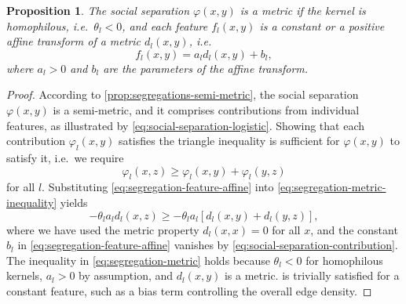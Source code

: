 \documentclass{scrartcl}
\newtheorem{prop}{Proposition}
\begin{document}
\begin{refsection}
\begin{prop}
    The social separation $\varphi(x,y)$ is a metric if the kernel is homophilous, i.e.\ $\theta_l<0$, and each feature $f_l(x, y)$ is a constant or a positive affine transform of a metric $d_l(x, y)$, i.e.
    \begin{equation}
        f_l(x, y) = a_l d_l(x, y) + b_l,\label{eq:segregation-feature-affine}
    \end{equation}
    where $a_l > 0$ and $b_l$ are the parameters of the affine transform.
\end{prop}
\begin{proof}
    According to \cref{prop:segregations-semi-metric}, the social separation $\varphi(x,y)$ is a semi-metric, and it comprises contributions from individual features, as illustrated by \cref{eq:social-separation-logistic}. Showing that each contribution $\varphi_l(x, y)$ satisfies the triangle inequality is sufficient for $\varphi(x, y)$ to satisfy it, i.e.\ we require
    \begin{equation}
        \varphi_l(x, z) \geq \varphi_l(x, y) + \varphi_l(y, z)\label{eq:segregation-metric-inequality}
    \end{equation}
    for all $l$. Substituting \cref{eq:segregation-feature-affine} into \cref{eq:segregation-metric-inequality} yields
    \begin{equation}
        -\theta_l a_l d_l(x, z)\geq -\theta_l a_l\left[d_l(x, y) + d_l(y, z)\right],\label{eq:segregation-metric}
    \end{equation}
    where we have used the metric property $d_l(x, x) = 0$ for all $x$, and the constant $b_l$ in \cref{eq:segregation-feature-affine} vanishes by \cref{eq:social-separation-contribution}. The inequality in \cref{eq:segregation-metric} holds because $\theta_l<0$ for homophilous kernels, $a_l>0$ by assumption, and $d_l(x, y)$ is a metric.  is trivially satisfied for a constant feature, such as a bias term controlling the overall edge density.
\end{proof}


\end{refsection}
\end{document}
